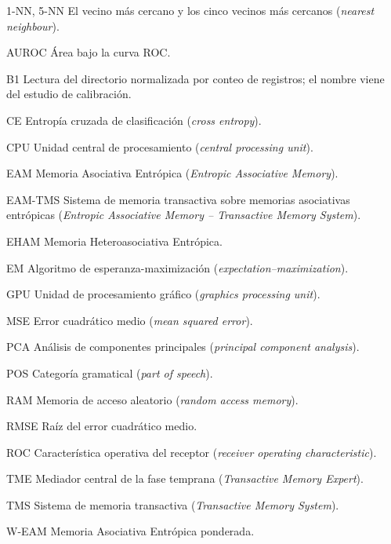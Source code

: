 \begin{symbols}
\begin{list}{}{\setlength{\labelwidth}{2.9cm}\setlength{\leftmargin}{3.3cm}%
  \setlength{\itemsep}{0pt}\renewcommand{\makelabel}[1]{\textbf{#1}\hfill}}
\item[1-NN, 5-NN] El vecino más cercano y los cinco vecinos más cercanos
  (\textit{nearest neighbour}).
\item[AUROC] Área bajo la curva ROC.
\item[B1] Lectura del directorio normalizada por conteo de registros; el nombre viene
  del estudio de calibración.
\item[CE] Entropía cruzada de clasificación (\textit{cross entropy}).
\item[CPU] Unidad central de procesamiento (\textit{central processing unit}).
\item[EAM] Memoria Asociativa Entrópica (\textit{Entropic Associative Memory}).
\item[EAM-TMS] Sistema de memoria transactiva sobre memorias asociativas entrópicas
  (\textit{Entropic Associative Memory -- Transactive Memory System}).
\item[EHAM] Memoria Heteroasociativa Entrópica.
\item[EM] Algoritmo de esperanza-maximización (\textit{expectation--maximization}).
\item[GPU] Unidad de procesamiento gráfico (\textit{graphics processing unit}).
\item[MSE] Error cuadrático medio (\textit{mean squared error}).
\item[PCA] Análisis de componentes principales (\textit{principal component analysis}).
\item[POS] Categoría gramatical (\textit{part of speech}).
\item[RAM] Memoria de acceso aleatorio (\textit{random access memory}).
\item[RMSE] Raíz del error cuadrático medio.
\item[ROC] Característica operativa del receptor (\textit{receiver operating
  characteristic}).
\item[TME] Mediador central de la fase temprana (\textit{Transactive Memory Expert}).
\item[TMS] Sistema de memoria transactiva (\textit{Transactive Memory System}).
\item[W-EAM] Memoria Asociativa Entrópica ponderada.
\end{list}
\end{symbols}
